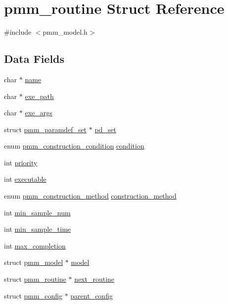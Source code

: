 \hypertarget{structpmm__routine}{\section{pmm\-\_\-routine Struct Reference}
\label{structpmm__routine}
}


{\ttfamily \#include $<$pmm\-\_\-model.\-h$>$}

\subsection*{Data Fields}
\begin{DoxyCompactItemize}
\item 
char $\ast$ \hyperlink{structpmm__routine_a521a61160c00c9adb1eba49b7dd757ae}{name}
\item 
char $\ast$ \hyperlink{structpmm__routine_a252b019e555def99e6b89d00ca94a9a6}{exe\-\_\-path}
\item 
char $\ast$ \hyperlink{structpmm__routine_a9ba0602ed7998074e27d09f3d84af1d1}{exe\-\_\-args}
\item 
struct \hyperlink{structpmm__paramdef__set}{pmm\-\_\-paramdef\-\_\-set} $\ast$ \hyperlink{structpmm__routine_afc1739e7dd564019db164b2b1b729e2d}{pd\-\_\-set}
\item 
enum \hyperlink{pmm__model_8h_a8f9119fce50fe8189b6c3067e0cea724}{pmm\-\_\-construction\-\_\-condition} \hyperlink{structpmm__routine_a99d29ad1702b5fb35a3ea26e2599f0c0}{condition}
\item 
int \hyperlink{structpmm__routine_a58c57e2623c560c895b6fef809c20fd5}{priority}
\item 
int \hyperlink{structpmm__routine_a7d23ff1fa04ae3364eef3cab8bdbd684}{executable}
\item 
enum \hyperlink{pmm__model_8h_aaa50bee09f2f605a884a2d93de5bf0d0}{pmm\-\_\-construction\-\_\-method} \hyperlink{structpmm__routine_a6aa0c60517889f830e3d533ccf022556}{construction\-\_\-method}
\item 
int \hyperlink{structpmm__routine_a221cb65185ab20cfa469683a3b0cdb59}{min\-\_\-sample\-\_\-num}
\item 
int \hyperlink{structpmm__routine_a1100a0314d4d64440a0a2fb9467e69a0}{min\-\_\-sample\-\_\-time}
\item 
int \hyperlink{structpmm__routine_ab8f49fc3bbd1e464e2740f17d962f2e6}{max\-\_\-completion}
\item 
struct \hyperlink{structpmm__model}{pmm\-\_\-model} $\ast$ \hyperlink{structpmm__routine_a8bd08af93178ac419df0657486609594}{model}
\item 
struct \hyperlink{structpmm__routine}{pmm\-\_\-routine} $\ast$ \hyperlink{structpmm__routine_a0867b006cd2a3f1dfc332fd8fd2f5ec4}{next\-\_\-routine}
\item 
struct \hyperlink{structpmm__config}{pmm\-\_\-config} $\ast$ \hyperlink{structpmm__routine_a2169ce86ef3483856130ac7a1d523931}{parent\-\_\-config}
\end{DoxyCompactItemize}


